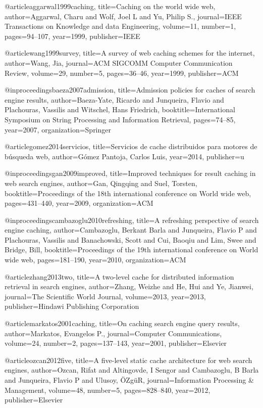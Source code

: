 @article{aggarwal1999caching,
	title={Caching on the world wide web},
	author={Aggarwal, Charu and Wolf, Joel L and Yu, Philip S.},
	journal={IEEE Transactions on Knowledge and data Engineering},
	volume={11},
	number={1},
	pages={94--107},
	year={1999},
	publisher={IEEE}
}

@article{wang1999survey,
	title={A survey of web caching schemes for the internet},
	author={Wang, Jia},
	journal={ACM SIGCOMM Computer Communication Review},
	volume={29},
	number={5},
	pages={36--46},
	year={1999},
	publisher={ACM}
}

@inproceedings{baeza2007admission,
	title={Admission policies for caches of search engine results},
	author={Baeza-Yate, Ricardo and Junqueira, Flavio and Plachouras, Vassilis and Witschel, Hans Friedrich},
	booktitle={International Symposium on String Processing and Information Retrieval},
	pages={74--85},
	year={2007},
	organization={Springer}
}

@article{gomez2014servicios,
	title={Servicios de cache distribuidos para motores de b{\'u}squeda web},
	author={G{\'o}mez Pantoja, Carlos Luis},
	year={2014},
	publisher={u}
}

@inproceedings{gan2009improved,
	title={Improved techniques for result caching in web search engines},
	author={Gan, Qingqing and Suel, Torsten},
	booktitle={Proceedings of the 18th international conference on World wide web},
	pages={431--440},
	year={2009},
	organization={ACM}
}

@inproceedings{cambazoglu2010refreshing,
	title={A refreshing perspective of search engine caching},
	author={Cambazoglu, Berkant Barla and Junqueira, Flavio P and Plachouras, Vassilis and Banachowski, Scott and Cui, Baoqiu and Lim, Swee and Bridge, Bill},
	booktitle={Proceedings of the 19th international conference on World wide web},
	pages={181--190},
	year={2010},
	organization={ACM}
}

@article{zhang2013two,
	title={A two-level cache for distributed information retrieval in search engines},
	author={Zhang, Weizhe and He, Hui and Ye, Jianwei},
	journal={The Scientific World Journal},
	volume={2013},
	year={2013},
	publisher={Hindawi Publishing Corporation}
}

@article{markatos2001caching,
	title={On caching search engine query results},
	author={Markatos, Evangelos P.},
	journal={Computer Communications},
	volume={24},
	number={2},
	pages={137--143},
	year={2001},
	publisher={Elsevier}
}

@article{ozcan2012five,
	title={A five-level static cache architecture for web search engines},
	author={Ozcan, Rifat and Altingovde, I Sengor and Cambazoglu, B Barla and Junqueira, Flavio P and Ulusoy, {\"O}Zg{\"u}R},
	journal={Information Processing \& Management},
	volume={48},
	number={5},
	pages={828--840},
	year={2012},
	publisher={Elsevier}
}

